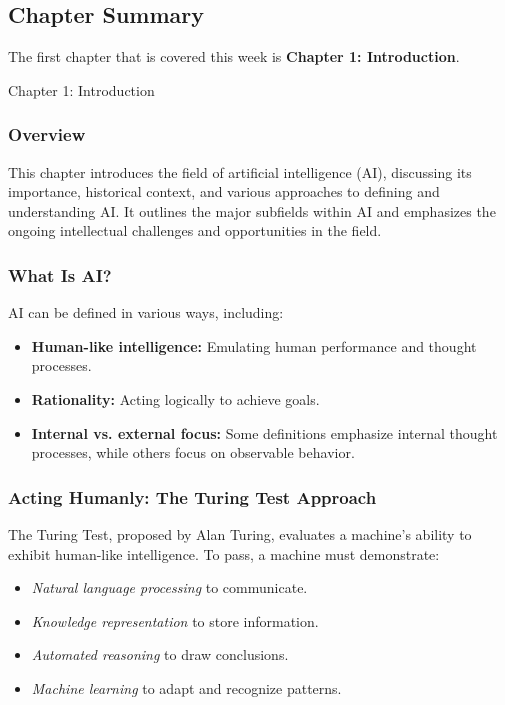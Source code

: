 \subsection{Chapter Summary}

The first chapter that is covered this week is \textbf{Chapter 1: Introduction}.

\begin{notes}{Chapter 1: Introduction}
    \subsubsection*{Overview}

    This chapter introduces the field of artificial intelligence (AI), discussing its importance, historical context, and various approaches to defining and understanding AI. It outlines the major 
    subfields within AI and emphasizes the ongoing intellectual challenges and opportunities in the field.

    \subsubsection*{What Is AI?}

    AI can be defined in various ways, including:
    \begin{itemize}
        \item \textbf{Human-like intelligence:} Emulating human performance and thought processes.
        \item \textbf{Rationality:} Acting logically to achieve goals.
        \item \textbf{Internal vs. external focus:} Some definitions emphasize internal thought processes, while others focus on observable behavior.
    \end{itemize}

    \subsubsection*{Acting Humanly: The Turing Test Approach}

    The Turing Test, proposed by Alan Turing, evaluates a machine's ability to exhibit human-like intelligence. To pass, a machine must demonstrate:
    \begin{itemize}
        \item \textit{Natural language processing} to communicate.
        \item \textit{Knowledge representation} to store information.
        \item \textit{Automated reasoning} to draw conclusions.
        \item \textit{Machine learning} to adapt and recognize patterns.
    \end{itemize}


\end{notes}
